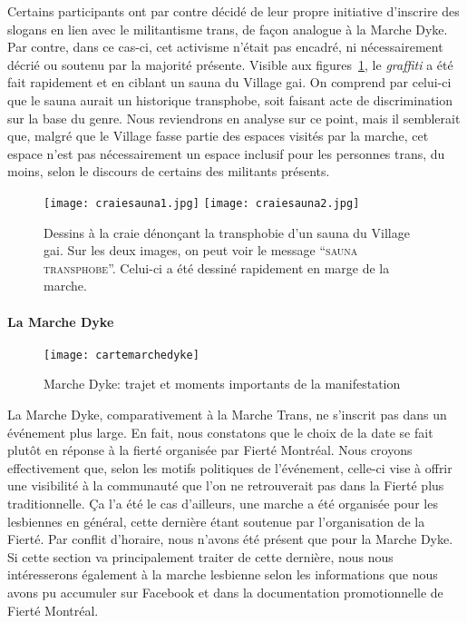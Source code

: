 Certains participants ont par contre décidé de leur propre initiative d'inscrire des slogans en lien avec le militantisme trans, de façon analogue à la Marche Dyke.
Par contre, dans ce cas-ci, cet activisme n'était pas encadré, ni nécessairement décrié ou soutenu par la majorité présente.
Visible aux figures~\ref{figs:craietrottoir}, le \emph{graffiti} a été fait rapidement et en ciblant un sauna du Village gai.
On comprend par celui-ci que le sauna aurait un historique transphobe, soit faisant acte de discrimination sur la base du genre.
Nous reviendrons en analyse sur ce point, mais il semblerait que, malgré que le Village fasse partie des espaces visités par la marche, cet espace n'est pas nécessairement un espace inclusif pour les personnes trans, du moins, selon le discours de certains des militants présents.

\begin{figure}[ht]
  \centering
  {\texttt{[image: craiesauna1.jpg]}}
  {\texttt{[image: craiesauna2.jpg]}}
  \caption[Dessin à la craie contre la transphobie]{Dessins à la craie dénonçant la transphobie d'un sauna du Village gai. Sur les deux images, on peut voir le message \enquote{\textsc{sauna transphobe}}. Celui-ci a été dessiné rapidement en marge de la marche.}\label{figs:craietrottoir}
\end{figure}

\paragraph{La Marche Dyke}
\label{subsubsec:marchedyke}

\begin{figure}[h]
  \centering
  \texttt{[image: cartemarchedyke]}
  \caption[Marche Dyke: trajet et événements]{Marche Dyke: trajet et moments importants de la manifestation}\label{fig:cartemarchedyke}
\end{figure}

La Marche Dyke, comparativement à la Marche Trans, ne s'inscrit pas dans un événement plus large.
En fait, nous constatons que le choix de la date se fait plutôt en réponse à la fierté organisée par Fierté Montréal.
Nous croyons effectivement que, selon les motifs politiques de l'événement, celle-ci vise à offrir une visibilité à la communauté \dyke{} que l'on ne retrouverait pas dans la Fierté plus traditionnelle.
Ça l'a été le cas d'ailleurs, une marche a été organisée pour les lesbiennes en général, cette dernière étant soutenue par l'organisation de la Fierté.
Par conflit d'horaire, nous n'avons été présent que pour la Marche Dyke.
Si cette section va principalement traiter de cette dernière, nous nous intéresserons également à la marche lesbienne selon les informations que nous avons pu accumuler sur Facebook et dans la documentation promotionnelle de Fierté Montréal.

